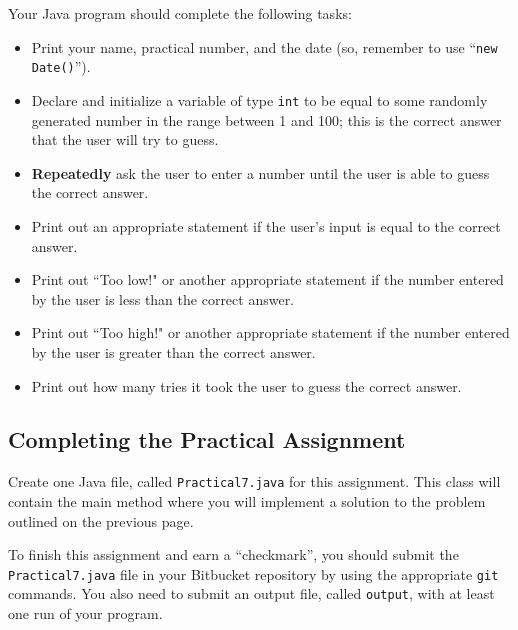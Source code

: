 Your Java program should complete the following tasks:

\begin{itemize}

  \item Print your name, practical number, and the date (so, remember to use ``{\tt new Date()}'').

  \item
    Declare and initialize a variable of type {\tt int} to be equal to some
    randomly generated number in the range between 1 and 100; this is the correct answer that the user will try to guess.

  \item
    \textbf{Repeatedly} ask the user to enter a number until the user is able to guess the correct answer.

  \item
    Print out an appropriate statement if the user's input is equal to the correct answer.

  \item
    Print out ``Too low!" or another appropriate statement if the number entered by the user is less than the correct answer.

  \item
    Print out ``Too high!" or another appropriate statement if the number entered by the user is greater than the correct answer.

  \item Print out how many tries it took the user to guess the correct answer.

\end{itemize}

\vspace*{-.1in}
\subsection*{Completing the Practical Assignment}

\vspace*{-.1in}
Create one Java file, called {\tt Practical7.java} for this assignment.
This class will contain the main method where you will implement a
solution to the problem outlined on the previous page.

\noindent To finish this assignment and earn a ``checkmark'', you should submit the
{\tt Practical7.java} file in your Bitbucket repository by using
the appropriate {\tt git} commands. You also need to submit an output file,
called {\tt output}, with at least one run of your program.

